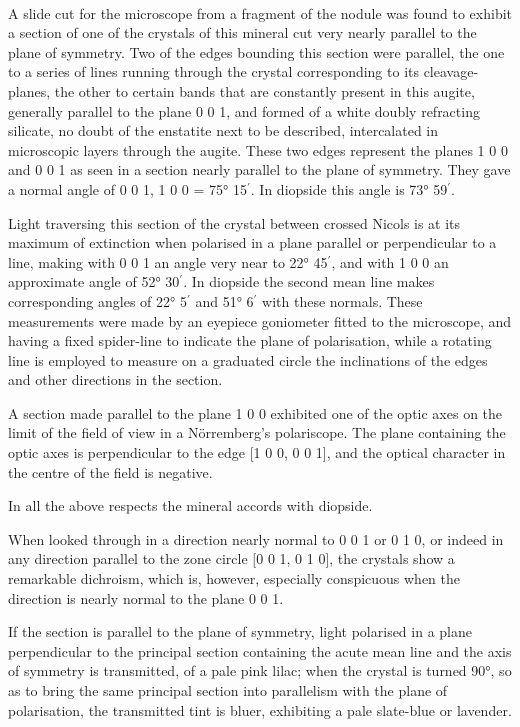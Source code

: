 \documentclass[a4paper, 12pt, oneside]{article}
\begin{document}
\paragraph{}
A slide cut for the microscope from a fragment of the nodule was found to exhibit a section of one of the crystals of this mineral cut very nearly parallel to the plane of symmetry. Two of the edges bounding this section were parallel, the one to a series of lines running through the crystal corresponding to its cleavage-planes, the other to certain bands that are constantly present in this augite, generally parallel to the plane 0 0 1, and formed of a white doubly refracting silicate, no doubt of the enstatite next to be described, intercalated in microscopic layers through the augite. These two edges represent the planes 1 0 0 and 0 0 1 as seen in a section nearly parallel to the plane of symmetry. They gave a normal angle of 0 0 1, 1 0 0 = 75° 15$^{\prime}$. In diopside this angle is 73° 59$^{\prime}$.

Light traversing this section of the crystal between crossed Nicols is at its maximum of extinction when polarised in a plane parallel or perpendicular to a line, making with 0 0 1 an angle very near to 22° 45$^{\prime}$, and with 1 0 0 an approximate angle of 52° 30$^{\prime}$. In diopside the second mean line makes corresponding angles of 22° 5$^{\prime}$ and 51° 6$^{\prime}$ with these normals. These measurements were made by an eyepiece goniometer fitted to the microscope, and having a fixed spider-line to indicate the plane of polarisation, while a rotating line is employed to measure on a graduated circle the inclinations of the edges and other directions in the section.

A section made parallel to the plane 1 0 0 exhibited one of the optic axes on the limit of the field of view in a Nörremberg's polariscope. The plane containing the optic axes is perpendicular to the edge [1 0 0, 0 0 1], and the optical character in the centre of the field is negative.

In all the above respects the mineral accords with diopside.

When looked through in a direction nearly normal to 0 0 1 or 0 1 0, or indeed in any direction parallel to the zone circle [0 0 1, 0 1 0], the crystals show a remarkable dichroism, which is, however, especially conspicuous when the direction is nearly normal to the plane 0 0 1.

If the section is parallel to the plane of symmetry, light polarised in a plane perpendicular to the principal section containing the acute mean line and the axis of symmetry is transmitted, of a pale pink lilac; when the crystal is turned 90°, so as to bring the same principal section into parallelism with the plane of polarisation, the transmitted tint is bluer, exhibiting a pale slate-blue or lavender.
\end{document}
